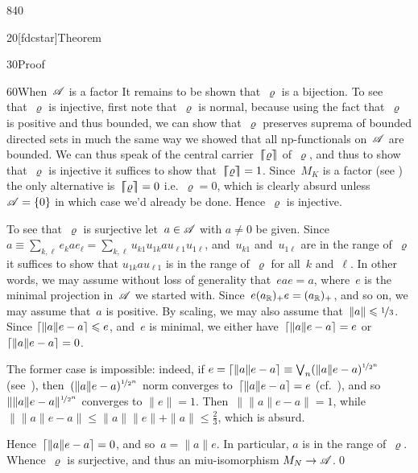 \begin{parsec}{840}
\begin{point}{20}[fdcstar]{Theorem}
\begin{point}{30}{Proof}
\begin{point}{60}{When~$\scrA$ is a factor}
It remains to be shown that~$\varrho$ is a bijection.
To see that~$\varrho$ is injective,
first note that~$\varrho$
is normal,
because using the fact that~$\varrho$ is positive
and thus bounded,
we can show that~$\varrho$ preserves suprema of bounded directed
sets in much the same way we showed
that all np-functionals on~$\scrA$ are bounded.
We can thus speak of the central carrier~$\cceil{\varrho}$
of~$\varrho$,
and thus to show that~$\varrho$ is injective
it suffices to show that~$\cceil{\varrho}=1$.
Since~$M_K$ is a factor
(see )
the only alternative
is~$\cceil{\varrho}=0$
i.e.~$\varrho=0$,
which is clearly absurd
unless~$\scrA=\{0\}$
in which case
we'd already be done.
Hence~$\varrho$ is injective.

To see that~$\varrho$ is surjective
let~$a\in\scrA$ with $a\neq 0$ be given.
Since~$a\equiv \sum_{k,\ell} e_k a e_\ell
= \sum_{k,\ell}u_{k1} u_{1k}au_{\ell 1} u_{1\ell}$,
and~$u_{k1}$ and~$u_{1\ell}$ are in the range of~$\varrho$
it suffices
to show that $u_{1k}a u_{\ell 1}$
is in the range of~$\varrho$
for all~$k$ and~$\ell$.
In other words,
we may assume without loss of generality
that~$e a e = a$,
where~$e$ is the minimal projection in~$\scrA$ we started with.
Since~$e(\Real{a})_+e= (\Real{a})_+$, and so on,
we may assume that~$a$ is positive.
By scaling,
we may also assume that~$\|a\|\leq \nicefrac{1}{3}$.
Since $\ceil{\|a\|e -a}\leq e$,
and~$e$ is minimal,
we either have~$\ceil{\|a\|e-a}=e$
or~$\ceil{\|a\|e-a}=0$.

The former case is impossible:
indeed,
if $e=\ceil{\|a\|e-a}\equiv \bigvee_n (\|a\|e-a)^{\nicefrac{1}{2^n}}$
(see~),
then~$(\|a\|e-a)^{\nicefrac{1}{2^n}}$
norm converges to~$\ceil{\|a\|e-a}=e$
(cf.~),
and so $\|\|a\|e-a\|^{\nicefrac{1}{2^n}}$
converges to $\|e\|=1$.
Then~$\|\|a\|e-a\|=1$,
while~$\|\|a\|e-a\|\leq \|a\|\|e\|+\|a\|\leq  \frac{2}{3}$,
which is absurd.

Hence~$\ceil{\|a\|e-a}=0$,
and so~$a=\|a\|e$.
In particular, $a$ is in the range of~$\varrho$.
Whence~$\varrho$ is surjective,
and thus an miu-isomorphism $M_N\to\scrA$.\qed
\end{point}
\end{point}
\end{point}
\end{parsec}
